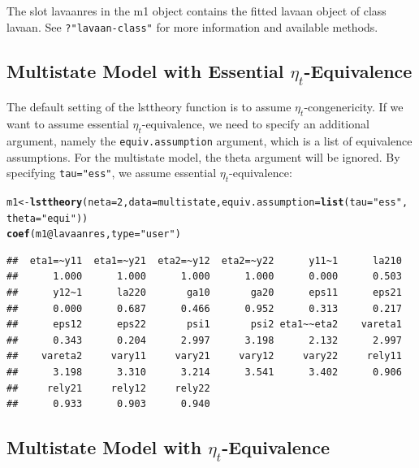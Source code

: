 \documentclass[10pt]{article}\usepackage{graphicx, color}
\makeatletter
\newcommand{\hlfunctioncall}[1]{\textcolor[rgb]{0.501960784313725,0,0.329411764705882}{\textbf{#1}}}%
\newcommand{\hlstring}[1]{\textcolor[rgb]{0.6,0.6,1}{#1}}%
\newenvironment{kframe}{%
 \def\at@end@of@kframe{}%
 \ifinner\ifhmode%
  \def\at@end@of@kframe{\end{minipage}}%
  \begin{minipage}{\columnwidth}%
 \fi\fi%
 \def\FrameCommand##1{\hskip\@totalleftmargin \hskip-\fboxsep
 \colorbox{shadecolor}{##1}\hskip-\fboxsep
     \hskip-\linewidth \hskip-\@totalleftmargin \hskip\columnwidth}%
 \MakeFramed {\advance\hsize-\width
   \@totalleftmargin\z@ \linewidth\hsize
   \@setminipage}}%
 {\par\unskip\endMakeFramed%
 \at@end@of@kframe}
\newenvironment{knitrout}{}{} %
\makeatother
\begin{document}
%
The slot lavaanres in the m1 object contains the fitted lavaan object of class lavaan. See \texttt{?"lavaan-class"} for more information and available methods.


\subsection{Multistate Model with Essential $\eta_t$-Equivalence}

The default setting of the lsttheory function is to assume $\eta_t$-congenericity. If we want to assume essential $\eta_t$-equivalence, we need to specify an additional argument, namely the \texttt{equiv.assumption} argument, which is a list of equivalence assumptions. For the multistate model, the theta argument will be ignored. By specifying \texttt{tau="ess"}, we assume essential $\eta_t$-equivalence:
%
\begin{knitrout}
\color{fgcolor}\begin{kframe}
\begin{alltt}
m1 <- \hlfunctioncall{lsttheory}(neta = 2, data = multistate, equiv.assumption = \hlfunctioncall{list}(tau = \hlstring{"ess"}, 
    theta = \hlstring{"equi"}))
\hlfunctioncall{coef}(m1@lavaanres, type = \hlstring{"user"})
\end{alltt}
\begin{verbatim}
##  eta1=~y11  eta1=~y21  eta2=~y12  eta2=~y22      y11~1      la210 
##      1.000      1.000      1.000      1.000      0.000      0.503 
##      y12~1      la220       ga10       ga20      eps11      eps21 
##      0.000      0.687      0.466      0.952      0.313      0.217 
##      eps12      eps22       psi1       psi2 eta1~~eta2    vareta1 
##      0.343      0.204      2.997      3.198      2.132      2.997 
##    vareta2     vary11     vary21     vary12     vary22     rely11 
##      3.198      3.310      3.214      3.541      3.402      0.906 
##     rely21     rely12     rely22 
##      0.933      0.903      0.940
\end{verbatim}
\end{kframe}
\end{knitrout}

%



\subsection{Multistate Model with $\eta_t$-Equivalence}
\end{document}

